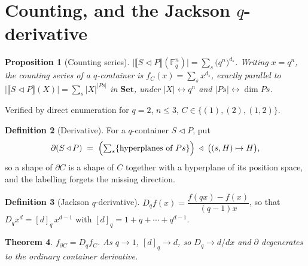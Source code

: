 \documentclass[11pt,a4paper]{article}
\newtheorem{theorem}{Theorem}[section]
\newtheorem{proposition}[theorem]{Proposition}
\theoremstyle{definition}
\newtheorem{definition}[theorem]{Definition}
\theoremstyle{remark}
\newcommand{\FF}{\mathbb{F}}
\newcommand{\cat}[1]{\mathbf{#1}}
\newcommand{\Set}{\cat{Set}}
\newcommand{\ext}[1]{\llbracket #1 \rrbracket}
\newcommand{\con}{\triangleleft}
\begin{document}
\begin{center}
\end{center}

\section{Counting, and the Jackson \texorpdfstring{$q$}{q}-derivative}

\begin{proposition}[Counting series]\label{prop:count}
$\bigl\lvert \ext{S \con P}(\FF_q^{n}) \bigr\rvert = \sum_{s} \bigl(q^{n}\bigr)^{d_s}$.
Writing $x = q^{n}$, the counting series of a $q$-container is
$f_C(x) = \sum_{s} x^{d_s}$, exactly parallel to
$\lvert\ext{S \con P}(X)\rvert = \sum_s \lvert X\rvert^{\lvert P s\rvert}$ in
$\Set$, under $\lvert X \rvert \leftrightarrow q^{n}$ and
$\lvert P s\rvert \leftrightarrow \dim P s$.
\end{proposition}

Verified by direct enumeration for $q = 2$, $n \le 3$, $C \in \{(1),(2),(1,2)\}$.

\begin{definition}[Derivative]\label{def:deriv}
For a $q$-container $S \con P$, put
\[
  \partial(S \con P) \;=\; \Bigl(\textstyle\sum_{s} \{\text{hyperplanes of } P s\}\Bigr)
  \;\con\; \bigl((s,H) \mapsto H\bigr),
\]
so a shape of $\partial C$ is a shape of $C$ together with a hyperplane of its
position space, and the labelling forgets the missing direction.
\end{definition}

\begin{definition}[Jackson $q$-derivative]
$D_q f(x) = \dfrac{f(qx) - f(x)}{(q-1)x}$, so that
$D_q x^{d} = [d]_q\, x^{d-1}$ with $[d]_q = 1 + q + \cdots + q^{d-1}$.
\end{definition}

\begin{theorem}\label{thm:D}
$f_{\partial C} = D_q f_C$. As $q \to 1$, $[d]_q \to d$, so $D_q \to d/dx$ and
$\partial$ degenerates to the ordinary container derivative.
\end{theorem}
\end{document}
